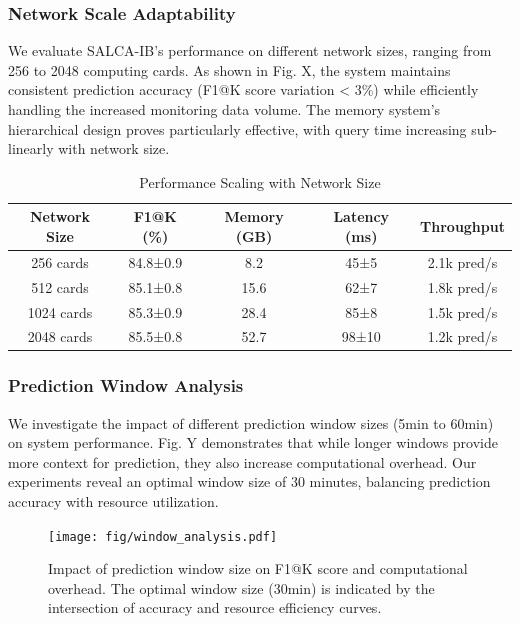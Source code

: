 \documentclass[conference]{IEEEtran}
\begin{document}
\subsubsection{Network Scale Adaptability}
We evaluate SALCA-IB's performance on different network sizes, ranging from 256 to 2048 computing cards. As shown in Fig. X, the system maintains consistent prediction accuracy (F1@K score variation < 3\%) while efficiently handling the increased monitoring data volume. The memory system's hierarchical design proves particularly effective, with query time increasing sub-linearly with network size.

\begin{table}[!t]
\caption{Performance Scaling with Network Size}
\label{tab:scale_network}
\renewcommand{\arraystretch}{1.2}
\begin{center}
\begin{tabular}{|c|c|c|c|c|}
\hline
\textbf{Network Size} & \textbf{F1@K (\%)} & \textbf{Memory (GB)} & \textbf{Latency (ms)} & \textbf{Throughput} \\
\hline
256 cards & 84.8±0.9 & 8.2 & 45±5 & 2.1k pred/s \\
512 cards & 85.1±0.8 & 15.6 & 62±7 & 1.8k pred/s \\
1024 cards & 85.3±0.9 & 28.4 & 85±8 & 1.5k pred/s \\
2048 cards & 85.5±0.8 & 52.7 & 98±10 & 1.2k pred/s \\
\hline
\end{tabular}
\end{center}
\end{table}

\subsubsection{Prediction Window Analysis}
We investigate the impact of different prediction window sizes (5min to 60min) on system performance. Fig. Y demonstrates that while longer windows provide more context for prediction, they also increase computational overhead. Our experiments reveal an optimal window size of 30 minutes, balancing prediction accuracy with resource utilization.

\begin{figure}[!t]
\centering
\texttt{[image: fig/window\_analysis.pdf]}
\caption{Impact of prediction window size on F1@K score and computational overhead. The optimal window size (30min) is indicated by the intersection of accuracy and resource efficiency curves.}
\label{fig:window_analysis}
\end{figure}
\end{document}
